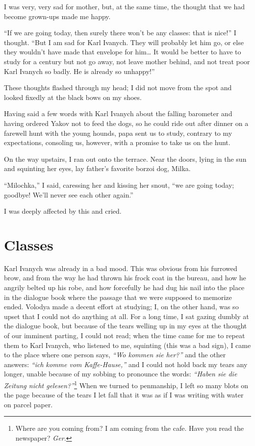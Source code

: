 I was very, very sad for mother, but, at the same time, the thought that we had become grown-ups made me happy.

``If we are going today, then surely there won't be any classes: that is nice!'' I thought. ``But I am sad for Karl Ivanych. They will probably let him go, or else they wouldn't have made that envelope for him\ldots{} It would be better to have to study for a century but not go away, not leave mother behind, and not treat poor Karl Ivanych so badly. He is already so unhappy!'' %

These thoughts flashed through my head; I did not move from the spot and looked fixedly at the black bows on my shoes.

Having said a few words with Karl Ivanych about the falling barometer and having ordered Yakov not to feed the dogs, so he could ride out after dinner on a farewell hunt with the young hounds, papa sent us to study, contrary to my expectations, consoling us, however, with a promise to take us on the hunt.

On the way upstairs, I ran out onto the terrace. Near the doors, lying in the sun and squinting her eyes, lay father's favorite borzoi dog, Milka.

``Milochka,'' I said, caressing her and kissing her snout, ``we are going today; goodbye! We'll never see each other again.'' %

I was deeply affected by this and cried.

\chapter{Classes} %

Karl Ivanych was already in a bad mood. This was obvious from his furrowed brow, and from the way he had thrown his frock coat in the bureau, and how he angrily belted up his robe, and how forcefully he had dug his nail into the place in the dialogue book where the passage that we were supposed to memorize ended. Volodya made a decent effort at studying; I, on the other hand, was so upset that I could not do anything at all. For a long time, I sat gazing dumbly at the dialogue book, but because of the tears welling up in my eyes at the thought of our imminent parting, I could not read; when the time came for me to repeat them to Karl Ivanych, who listened to me, squinting (this was a bad sign), I came to the place where one person says, \textit{``Wo kommen sie her?''} and the other answers: \textit{``ich komme vom Kaffe-Hause,''} and I could not hold back my tears any longer, unable because of my sobbing to pronounce the words: \textit{``Haben sie die Zeitung nicht gelesen?''}\footnote{Where are you coming from? I am coming from the cafe. Have you read the newspaper? \textit{Ger.}} When we turned to penmanship, I left so many blots on the page because of the tears I let fall that it was as if I was writing with water on parcel paper.

